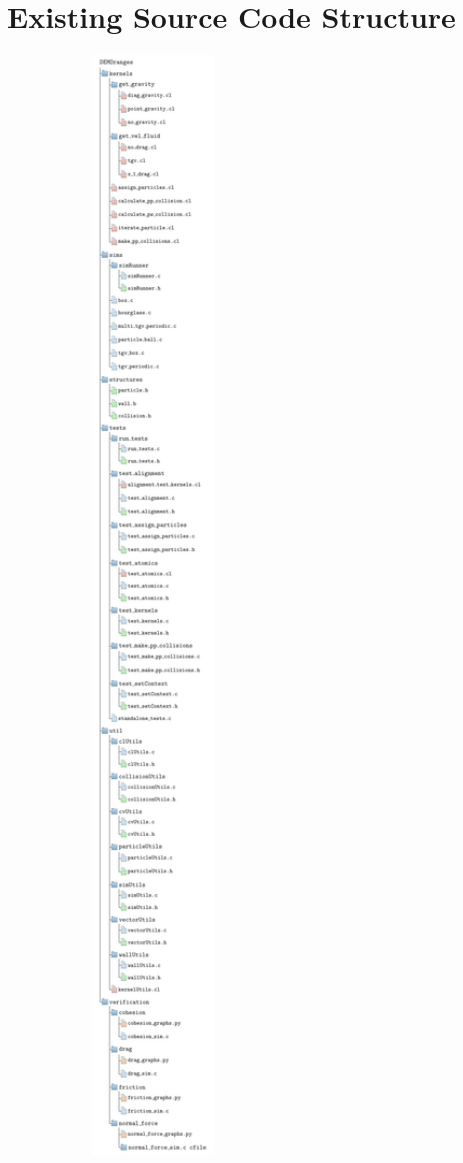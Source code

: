 \documentclass[../Interim_Report_Master]{subfiles}
\begin{document}
\section{Existing Source Code Structure}\label{prog_strut}
\begin{figure}
	\centering
	\includegraphics*[width=0.5\textwidth, trim=0 1150 0 0, clip]{./Diagrams/DEMOranges_Structure/DEMOranges_Structure.pdf}
\end{figure}
\end{document}
